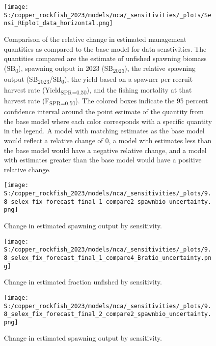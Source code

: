 \documentclass[11pt,
  english,
  letterpaper,
]{article}
\begin{document}
\newpage

\begin{figure}
\centering
\texttt{[image: S:/copper\_rockfish\_2023/models/nca/\_sensitivities/\_plots/Sensi\_REplot\_data\_horizontal.png]}
\caption{Comparison of the relative change in estimated management quantities as compared to the base model for data senstivities. The quantities compared are the estimate of unfished spawning biomass (SB\textsubscript{0}), spawning output in 2023 (SB\textsubscript{2023}), the relative spawning output (SB\textsubscript{2023}/SB\textsubscript{0}), the yield based on a spawner per recruit harvest rate (Yield\textsubscript{SPR=0.50}), and the fishing mortality at that harvest rate (F\textsubscript{SPR=0.50}). The colored boxes indicate the 95 percent confidence interval around the point estimate of the quantity from the base model where each color corresponds with a specific quantity in the legend. A model with matching estimates as the base model would reflect a relative change of 0, a model with estimates less than the base model would have a negative relative change, and a model with estimates greater than the base model would have a positive relative change.\label{fig:sens-data}}
\end{figure}

\newpage

\begin{figure}
\centering
\texttt{[image: S:/copper\_rockfish\_2023/models/nca/\_sensitivities/\_plots/9.8\_selex\_fix\_forecast\_final\_1\_compare2\_spawnbio\_uncertainty.png]}
\caption{Change in estimated spawning output by sensitivity.\label{fig:sens-ssb-1}}
\end{figure}

\newpage

\begin{figure}
\centering
\texttt{[image: S:/copper\_rockfish\_2023/models/nca/\_sensitivities/\_plots/9.8\_selex\_fix\_forecast\_final\_1\_compare4\_Bratio\_uncertainty.png]}
\caption{Change in estimated fraction unfished by sensitivity.\label{fig:sens-depl-1}}
\end{figure}

\newpage

\begin{figure}
\centering
\texttt{[image: S:/copper\_rockfish\_2023/models/nca/\_sensitivities/\_plots/9.8\_selex\_fix\_forecast\_final\_2\_compare2\_spawnbio\_uncertainty.png]}
\caption{Change in estimated spawning output by sensitivity.\label{fig:sens-ssb-2}}
\end{figure}
\end{document}
